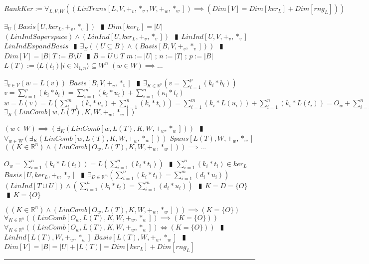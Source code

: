 \documentclass{book}
\newcommand{\abr}{:=}
\newcommand{\pipe}{$\phantom{(}\vrectangleblack\phantom{)}$}
\newcommand{\pr}[1]{\left(#1\right)}
\begin{document}
$RankKer \abr \forall_{L, V, W}\pr{(LinTrans[L, V, +_v, *_v, W, +_w, *_w]) \implies (Dim[V] = Dim[ker_L] + Dim[rng_L])}$
\begin{enumerate}
  \lit $\exists_{U}(Basis[U, ker_L, +_v, *_v])$ \pipe $Dim[ker_L] = |U|$
  \lit $(LinIndSuperspace) \land (LinInd[U, ker_L, +_v, *_v])$ \pipe $LinInd[U, V, +_v, *_v]$
  \lit $LinIndExpandBasis$ \pipe $\exists_{B}\pr{(U \subseteq B)\land (Basis[B, V, +_v, *_v])}$ \pipe $Dim[V] = |B|$
  \lit $T \abr B \setminus U$ \pipe $B = U \cup T$ 
  \lit $m \abr |U|$ ; $n \abr |T|$ ; $p \abr |B|$
  \lit $L(T) \abr \langle L(t_i) | i \in \mathbb{N}_{1, n} \rangle \subseteq W^n$
  \lit $(w \in W) \implies \ldots$
  \begin{enumerate}
    \lit $\exists_{v \in V}\pr{w = L(v)}$
    \lit $Basis[B, V, +_v, *_v]$ \pipe $\exists_{K \in \mathbb{R}^p}\pr{v = \sum_{i = 1}^{p}(k_i * b_i)}$
    \lit $v = \sum_{i = 1}^{p}(k_i * b_i) = \sum_{i = 1}^{m}(k_i * u_i) + \sum_{i = 1}^{n}(\kappa_i * t_i)$
    \lit $w = L(v) = L\pr{\sum_{i = 1}^{m}(k_i * u_i) + \sum_{i = 1}^{n}(k_i * t_i)} = \sum_{i = 1}^{m}\pr{k_i * L(u_i)} + \sum_{i = 1}^{n}\pr{k_i * L(t_i)} = O_w + \sum_{i = 1}^{n}\pr{k_i * L(t_i)} = \sum_{i = 1}^{n}\pr{k_i * L(t_i)}$
    \lit $\exists_{K}\pr{LinComb[w, L(T), K, W, +_w, *_w]}$
  \end{enumerate}
  \lit $(w \in W) \implies \pr{\exists_{K}\pr{LinComb[w, L(T), K, W, +_w, *_w]}}$ \pipe $\forall_{w \in W}\pr{\exists_{K}\pr{LinComb[w, L(T), K, W, +_w, *_w]}}$
  \lit $Spans[L(T), W, +_w, *_w]$
  \lit $\pr{(K \in \mathbb{R}^n) \land \pr{LinComb[O_w, L(T), K, W, +_w, *_w]}} \implies \ldots$
  \begin{enumerate}
    \lit $O_w = \sum_{i = 1}^{n}\pr{k_i * L(t_i)} = L\pr{\sum_{i = 1}^{n}(k_i * t_i)}$ \pipe $\sum_{i = 1}^{n}(k_i * t_i) \in ker_L$ 
    \lit $Basis[U, ker_L, +_v, *_v]$ \pipe $\exists_{D \in \mathbb{R}^m}\pr{\sum_{i = 1}^{n}(k_i * t_i) = \sum_{i = 1}^{m}(d_i * u_i)}$
    \lit $(LinInd[T \cup U]) \land \pr{\sum_{i = 1}^{n}(k_i * t_i) = \sum_{i = 1}^{m}(d_i * u_i)}$ \pipe $K = D = \{O\}$ \pipe $K = \{O\}$
  \end{enumerate}
  \lit $\pr{(K \in \mathbb{R}^n) \land \pr{LinComb[O_w, L(T), K, W, +_w, *_w]}} \implies (K = \{O\})$
  \lit $\forall_{K \in \mathbb{R}^n}\pr{\pr{LinComb[O_w, L(T), K, W, +_w, *_w]} \implies (K = \{O\})}$
  \lit $\forall_{K \in \mathbb{R}^n}\pr{\pr{LinComb[O_w, L(T), K, W, +_w, *_w]} \iff (K = \{O\})}$ \pipe $LinInd[L(T), W, +_w, *_w]$
  \lit $Basis[L(T), W, +_w, *_w]$ \pipe $Dim[V] = |B| = |U| + |L(T)| = Dim[ker_L] + Dim[rng_L]$
\end{enumerate} \vspace{.75mm} \hrule \vspace{.75mm} \ \\ 
\end{document}
